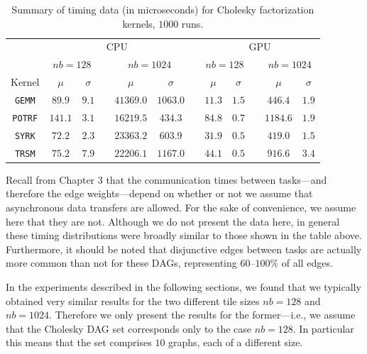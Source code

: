\documentclass[12pt]{article}
\begin{document}
\begin{table}
	\caption{Summary of timing data (in microseconds) for Cholesky factorization kernels, $1000$ runs.} 
	\begin{center}	
		\begin{tabular}{c c c c c c c c c c c c}
                  \toprule
                  & \multicolumn{5}{c}{CPU} && \multicolumn{5}{c}{GPU}    \\
                  \cmidrule{2-6} \cmidrule{8-12}
                  & \multicolumn{2}{c}{$nb = 128$} && \multicolumn{2}{c}{$nb = 1024$} &&  \multicolumn{2}{c}{$nb = 128$} && \multicolumn{2}{c}{$nb = 1024$}   \\
                  \cmidrule{2-3} \cmidrule{5-6} \cmidrule{8-9} \cmidrule{11-12}
                  Kernel & $\mu$ & $\sigma$ && $\mu$ & $\sigma$ && $\mu$ & $\sigma$ && $\mu$ & $\sigma$\\
                  \cmidrule{1-12}
                  {\tt GEMM} & $89.9$ & $9.1$ && $41369.0$ & $1063.0$ && $11.3$ & $1.5$ && $446.4$ & $1.9$ \\
                  {\tt POTRF} & $141.1$ & $3.1$ && $16219.5$ & $434.3$ && $84.8$ & $0.7$ && $1184.6$ & $1.9$ \\
                  {\tt SYRK} & $72.2$ & $2.3$ && $23363.2$ & $603.9$ && $31.9$ & $0.5$ && $419.0$ & $1.5$ \\
                  {\tt TRSM} & $75.2$ & $7.9$ && $22206.1$ & $1167.0$ && $44.1$ & $0.5$ && $916.6$ & $3.4$ \\
		\bottomrule
		\end{tabular}
		\label{tb.cholesky_samples}
	\end{center}	
      \end{table}

      Recall from Chapter 3 that the communication times between tasks---and therefore the edge weights---depend on whether or not we assume that asynchronous data transfers are allowed. For the sake of convenience, we assume here that they are not. Although we do not present the data here, in general these timing distributions were broadly similar to those shown in the table above. Furthermore, it should be noted that disjunctive edges between tasks are actually more common than not for these DAGs, representing $60$--$100\%$ of all edges.

      In the experiments described in the following sections, we found that we typically obtained very similar results for the two different tile sizes $nb = 128$ and $nb = 1024$. Therefore we only present the results for the former---i.e., we assume that the Cholesky DAG set corresponds only to the case $nb = 128$. In particular this means that the set comprises $10$ graphs, each of a different size.    
      
\end{document}
